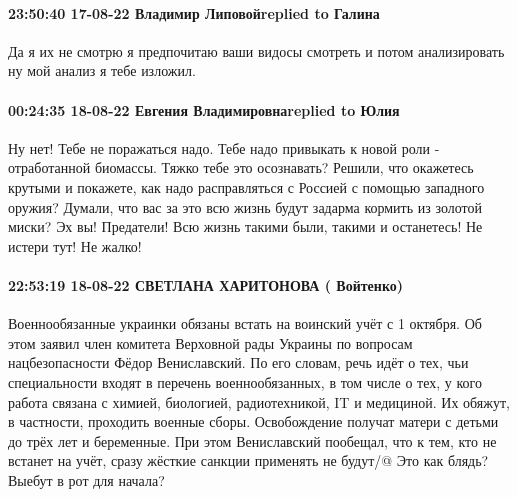  
 
 
 
 

\paragraph{23:50:40 17-08-22 Владимир Липовойreplied to Галина}

Да я их не смотрю я предпочитаю ваши видосы смотреть и потом анализировать ну
мой анализ я тебе изложил.

\paragraph{00:24:35 18-08-22 Евгения Владимировнаreplied to Юлия}

Ну нет! Тебе не поражаться надо. Тебе надо привыкать к новой роли -
отработанной биомассы. Тяжко тебе это осознавать? Решили, что окажетесь крутыми
и покажете, как надо расправляться с Россией с помощью западного оружия?
Думали, что вас за это всю жизнь будут задарма кормить из золотой миски? Эх вы!
Предатели! Всю жизнь такими были, такими и останетесь! Не истери тут! Не жалко!

\paragraph{22:53:19 18-08-22 СВЕТЛАНА ХАРИТОНОВА ( Войтенко)}

Военнообязанные украинки обязаны встать на воинский учёт с 1 октября.
Об этом заявил член комитета Верховной рады Украины по вопросам нацбезопасности Фёдор Вениславский.
По его словам, речь идёт о тех, чьи специальности входят в перечень военнообязанных, в том числе о тех, у кого работа связана с химией, биологией, радиотехникой, IT и медициной.
Их обяжут, в частности, проходить военные сборы. Освобождение получат матери с детьми до трёх лет и беременные.
При этом Вениславский пообещал, что к тем, кто не встанет на учёт, сразу жёсткие санкции применять не будут/@
Это как блядь?Выебут в рот для начала?🤣🤣🤣

